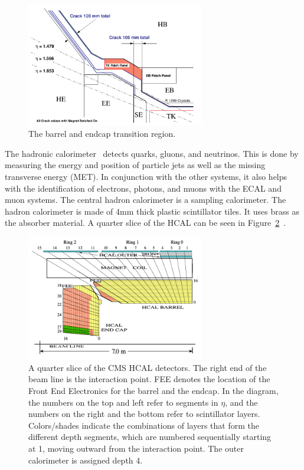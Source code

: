 \begin{figure}[htb]
\centering
\includegraphics[width=0.69\textwidth]{Experiment/ECAL_TDR_crack.pdf}
\caption{The barrel and endcap transition region.~\cite{ECAL_report}}
\label{fig:CMS_ecal_crack}
\end{figure}

The hadronic calorimeter~\cite{HCAL_report} detects quarks, gluons, and neutrinos.  This is done by measuring the energy and position of particle jets as well as the missing transverse energy (MET).  In conjunction with the other systems, it also helps with the identification of electrons, photons, and muons with the ECAL and muon systems.  The central hadron calorimeter is a sampling calorimeter. The hadron calorimeter is made of 4mm thick plastic scintillator tiles. It uses brass as the absorber material. A quarter slice of the HCAL can be seen in Figure~\ref{fig:CMS_hcal}~\cite{Chatrchyan:2009hw}.

\begin{figure}[htb]
\centering
\includegraphics[width=0.69\textwidth]{Experiment/fig_HCALdiagram.png}
\caption{A quarter slice of the CMS HCAL detectors. The right end of the beam line is the interaction point. FEE denotes the location of the Front End Electronics for the barrel and the endcap. In the diagram, the numbers on the top and left refer to segments in $\eta$, and the numbers on the right and the bottom refer to scintillator layers. Colors/shades indicate the combinations of layers that form the different depth segments, which are numbered sequentially starting at 1, moving outward from the interaction point. The outer calorimeter is assigned depth 4.~\cite{Chatrchyan:2009hw}}
\label{fig:CMS_hcal}
\end{figure}


